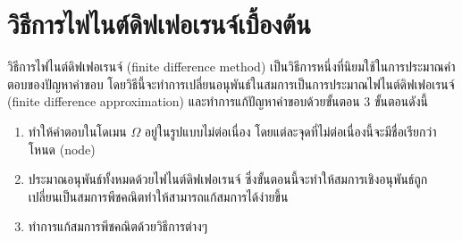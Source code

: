 \section{วิธีการไฟไนต์ดิฟเฟอเรนจ์เบื้องต้น}
\hspace{1cm} วิธีการไฟไนต์ดิฟเฟอเรนจ์ (finite difference method) เป็นวิธีการหนึ่งที่นิยมใช้ในการประมาณคำตอบของปัญหาค่าขอบ โดยวิธีนี้จะทำการเปลี่ยนอนุพันธ์ในสมการเป็นการประมาณไฟไนต์ดิฟเฟอเรนจ์ (finite difference approximation) และทำการแก้ปัญหาค่าขอบด้วยขั้นตอน 3 ขั้นตอนดังนี้

\begin{enumerate}
    \item ทำให้คำตอบในโดเมน $\Omega$ อยู่ในรูปแบบไม่ต่อเนื่อง โดยแต่ละจุดที่ไม่ต่อเนื่องนี้จะมีชื่อเรียกว่าโหนด (node)
    \item ประมาณอนุพันธ์ทั้งหมดด้วยไฟไนต์ดิฟเฟอเรนจ์ ซึ่งขั้นตอนนี้จะทำให้สมการเชิงอนุพันธ์ถูกเปลี่ยนเป็นสมการพีชคณิตทำให้สามารถแก้สมการได้ง่ายขึ้น
    \item ทำการแก้สมการพีชคณิตด้วยวิธีการต่างๆ
\end{enumerate}
